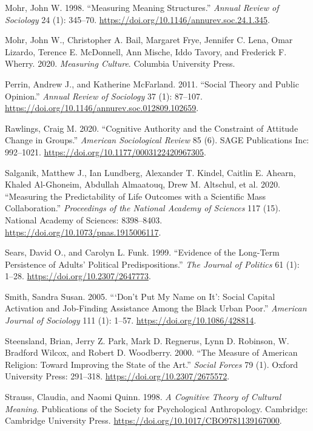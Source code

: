 \documentclass[12pt,]{article}
\begin{document}
\leavevmode\hypertarget{ref-mohr1998}{}%
Mohr, John W. 1998. ``Measuring Meaning Structures.'' \emph{Annual Review of Sociology} 24 (1): 345--70. \url{https://doi.org/10.1146/annurev.soc.24.1.345}.

\leavevmode\hypertarget{ref-mohr2020}{}%
Mohr, John W., Christopher A. Bail, Margaret Frye, Jennifer C. Lena, Omar Lizardo, Terence E. McDonnell, Ann Mische, Iddo Tavory, and Frederick F. Wherry. 2020. \emph{Measuring Culture}. Columbia University Press.

\leavevmode\hypertarget{ref-perrin2011}{}%
Perrin, Andrew J., and Katherine McFarland. 2011. ``Social Theory and Public Opinion.'' \emph{Annual Review of Sociology} 37 (1): 87--107. \url{https://doi.org/10.1146/annurev.soc.012809.102659}.

\leavevmode\hypertarget{ref-rawlings2020}{}%
Rawlings, Craig M. 2020. ``Cognitive Authority and the Constraint of Attitude Change in Groups.'' \emph{American Sociological Review} 85 (6). SAGE Publications Inc: 992--1021. \url{https://doi.org/10.1177/0003122420967305}.

\leavevmode\hypertarget{ref-salganik2020}{}%
Salganik, Matthew J., Ian Lundberg, Alexander T. Kindel, Caitlin E. Ahearn, Khaled Al-Ghoneim, Abdullah Almaatouq, Drew M. Altschul, et al. 2020. ``Measuring the Predictability of Life Outcomes with a Scientific Mass Collaboration.'' \emph{Proceedings of the National Academy of Sciences} 117 (15). National Academy of Sciences: 8398--8403. \url{https://doi.org/10.1073/pnas.1915006117}.

\leavevmode\hypertarget{ref-sears1999}{}%
Sears, David O., and Carolyn L. Funk. 1999. ``Evidence of the Long-Term Persistence of Adults' Political Predispositions.'' \emph{The Journal of Politics} 61 (1): 1--28. \url{https://doi.org/10.2307/2647773}.

\leavevmode\hypertarget{ref-smith2005}{}%
Smith, Sandra Susan. 2005. ```Don't Put My Name on It': Social Capital Activation and Job‐Finding Assistance Among the Black Urban Poor.'' \emph{American Journal of Sociology} 111 (1): 1--57. \url{https://doi.org/10.1086/428814}.

\leavevmode\hypertarget{ref-steensland2000}{}%
Steensland, Brian, Jerry Z. Park, Mark D. Regnerus, Lynn D. Robinson, W. Bradford Wilcox, and Robert D. Woodberry. 2000. ``The Measure of American Religion: Toward Improving the State of the Art.'' \emph{Social Forces} 79 (1). Oxford University Press: 291--318. \url{https://doi.org/10.2307/2675572}.

\leavevmode\hypertarget{ref-strauss1998}{}%
Strauss, Claudia, and Naomi Quinn. 1998. \emph{A Cognitive Theory of Cultural Meaning}. Publications of the Society for Psychological Anthropology. Cambridge: Cambridge University Press. \url{https://doi.org/10.1017/CBO9781139167000}.
\end{document}
